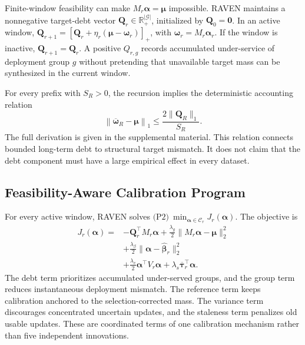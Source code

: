 \documentclass[letterpaper,journal]{IEEEtran}
\begin{document}
Finite-window feasibility can make
$M_r\boldsymbol\alpha=\boldsymbol\mu$ impossible.  RAVEN maintains a
nonnegative target-debt vector
$\mathbf{Q}_r\in\mathbb{R}^{|\mathcal{G}|}_+$, initialized by
$\mathbf{Q}_0=\mathbf{0}$.  In an active window,
$\mathbf{Q}_{r+1}=\left[\mathbf{Q}_r+\eta_r(\boldsymbol\mu-\boldsymbol\omega_r)\right]_+$,
with $\boldsymbol\omega_r=M_r\boldsymbol\alpha_r$.
If the window is inactive, $\mathbf{Q}_{r+1}=\mathbf{Q}_r$.  A positive
$Q_{r,g}$ records accumulated under-service of deployment group $g$ without
pretending that unavailable target mass can be synthesized in the current
window.

For every prefix with $S_R>0$, the recursion implies the deterministic
accounting relation
\begin{equation}
 \left\|
 \overline{\boldsymbol\omega}_R-\boldsymbol\mu
 \right\|_1
 \le
 \frac{
 2\|\mathbf{Q}_R\|_1
 }{S_R}.
 \label{eq:debt_bound}
\end{equation}
The full derivation is given in the supplemental material.  This relation connects
bounded long-term debt to structural target mismatch.  It does not
claim that the debt component must have a large empirical effect in
every dataset.

\subsection{Feasibility-Aware Calibration Program}
\label{subsec:P2}

For every active window, RAVEN solves
$\text{(P2)}\ \min_{\boldsymbol\alpha\in\mathcal{C}_r}J_r(\boldsymbol\alpha)$.
The objective is
\begin{align}
 J_r(\boldsymbol\alpha)
 ={}&-\mathbf{Q}_r^{\top}M_r\boldsymbol\alpha
 +\frac{\lambda_g}{2}
 \|M_r\boldsymbol\alpha-\boldsymbol\mu\|_2^2
 \nonumber\\
 &+\frac{\lambda_{\beta}}{2}
 \|\boldsymbol\alpha-\widehat{\boldsymbol\beta}_r\|_2^2
 \nonumber\\
 &+\frac{\lambda_v}{2}
 \boldsymbol\alpha^{\top}V_r\boldsymbol\alpha
 +\lambda_s\overline{\boldsymbol\tau}_r^{\top}\boldsymbol\alpha.
\label{eq:P2_objective}
\end{align}
The debt term prioritizes accumulated under-served groups, and the
group term reduces instantaneous deployment mismatch.  The reference
term keeps calibration anchored to the selection-corrected mass.  The
variance term discourages concentrated uncertain updates, and the
staleness term penalizes old usable updates.  These are coordinated
terms of one calibration mechanism rather than five independent
innovations.
\end{document}
